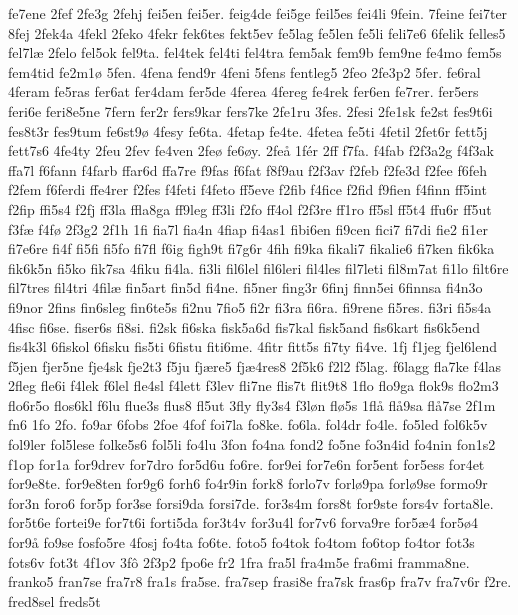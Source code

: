 {fe7ene
2fef
2fe3g
2fehj
fei5en
fei5er.
feig4de
fei5ge
feil5es
fei4li
9fein.
7feine
fei7ter
8fej
2fek4a
4fekl
2feko
4fekr
fek6tes
fekt5ev
fe5lag
fe5len
fe5li
feli7e6
6felik
felles5
fel7læ
2felo
fel5ok
fel9ta.
fel4tek
fel4ti
fel4tra
fem5ak
fem9b
fem9ne
fe4mo
fem5s
fem4tid
fe2m1ø
5fen.
4fena
fend9r
4feni
5fens
fentleg5
2feo
2fe3p2
5fer.
fe6ral
4feram
fe5ras
fer6at
fer4dam
fer5de
4ferea
4fereg
fe4rek
fer6en
fe7rer.
fer5ers
feri6e
feri8e5ne
7fern
fer2r
fers9kar
fers7ke
2fe1ru
3fes.
2fesi
2fe1sk
fe2st
fes9t6i
fes8t3r
fes9tum
fe6st9ø
4fesy
fe6ta.
4fetap
fe4te.
4fetea
fe5ti
4fetil
2fet6r
fett5j
fett7s6
4fe4ty
2feu
2fev
fe4ven
2feø
fe6øy.
2feå
1fér
2ff
f7fa.
f4fab
f2f3a2g
f4f3ak
ffa7l
f6fann
f4farb
ffar6d
ffa7re
f9fas
f6fat
f8f9au
f2f3av
f2feb
f2fe3d
f2fee
f6feh
f2fem
f6ferdi
ffe4rer
f2fes
f4feti
f4feto
ff5eve
f2fib
f4fice
f2fid
f9fien
f4finn
ff5int
f2fip
ffi5s4
f2fj
ff3la
ffla8ga
ff9leg
ff3li
f2fo
ff4ol
f2f3re
ff1ro
ff5sl
ff5t4
ffu6r
ff5ut
f3fæ
f4fø
2f3g2
2f1h
1fi
fia7l
fia4n
4fiap
fi4as1
fibi6en
fi9cen
fici7
fi7di
fie2
fi1er
fi7e6re
fi4f
fi5fi
fi5fo
fi7fl
f6ig
figh9t
fi7g6r
4fih
fi9ka
fikali7
fikalie6
fi7ken
fik6ka
fik6k5n
fi5ko
fik7sa
4fiku
fi4la.
fi3li
fil6lel
fil6leri
fil4les
fil7leti
fil8m7at
fi1lo
filt6re
fil7tres
fil4tri
4filæ
fin5art
fin5d
fi4ne.
fi5ner
fing3r
6finj
finn5ei
6finnsa
fi4n3o
fi9nor
2fins
fin6sleg
fin6te5s
fi2nu
7fio5
fi2r
fi3ra
fi6ra.
fi9rene
fi5res.
fi3ri
fi5s4a
4fisc
fi6se.
fiser6s
fi8si.
fi2sk
fi6ska
fisk5a6d
fis7kal
fisk5and
fis6kart
fis6k5end
fis4k3l
6fiskol
6fisku
fis5ti
6fistu
fiti6me.
4fitr
fitt5s
fi7ty
fi4ve.
1fj
f1jeg
fjel6lend
f5jen
fjer5ne
fje4sk
fje2t3
f5ju
fjære5
fjæ4res8
2f5k6
f2l2
f5lag.
f6lagg
fla7ke
f4las
2fleg
fle6i
f4lek
f6lel
fle4sl
f4lett
f3lev
fli7ne
flis7t
flit9t8
1flo
flo9ga
flok9s
flo2m3
flo6r5o
flos6kl
f6lu
flue3s
flus8
fl5ut
3fly
fly3s4
f3løn
flø5s
1flå
flå9sa
flå7se
2f1m
fn6
1fo
2fo.
fo9ar
6fobs
2foe
4fof
foi7la
fo8ke.
fo6la.
fol4dr
fo4le.
fo5led
fol6k5v
fol9ler
fol5lese
folke5s6
fol5li
fo4lu
3fon
fo4na
fond2
fo5ne
fo3n4id
fo4nin
fon1s2
f1op
for1a
for9drev
for7dro
for5d6u
fo6re.
for9ei
for7e6n
for5ent
for5ess
for4et
for9e8te.
for9e8ten
for9g6
forh6
fo4r9in
fork8
forlo7v
forlø9pa
forlø9se
formo9r
for3n
foro6
for5p
for3se
forsi9da
forsi7de.
for3s4m
fors8t
for9ste
fors4v
forta8le.
for5t6e
fortei9e
for7t6i
forti5da
for3t4v
for3u4l
for7v6
forva9re
for5æ4
for5ø4
for9å
fo9se
fosfo5re
4fosj
fo4ta
fo6te.
foto5
fo4tok
fo4tom
fo6top
fo4tor
fot3s
fots6v
fot3t
4f1ov
3fô
2f3p2
fpo6e
fr2
1fra
fra5l
fra4m5e
fra6mi
framma8ne.
franko5
fran7se
fra7r8
fra1s
fra5se.
fra7sep
frasi8e
fra7sk
fras6p
fra7v
fra7v6r
f2re.
fred8sel
freds5t
}
